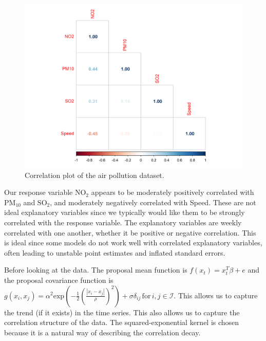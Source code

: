 \documentclass[a4paper, 10pt]{article}
\begin{document}
\begin{flushleft}
      \begin{figure}[H]
         \raggedright
         \includegraphics[width=0.48\linewidth]{../images/corrplot_2019.png}
         \caption{Correlation plot of the air pollution dataset.}
      \end{figure}

      Our response variable $\text{NO}_{2}$ appears to be moderately positively correlated with $\text{PM}_{10}$ and $\text{SO}_{2}$, and moderately negatively correlated with Speed. These are not ideal explanatory variables since we typically would like them to be strongly correlated with the response variable. The explanatory variables are weekly correlated with one another, whether it be positive or negative correlation. This is ideal since some models do not work well with correlated explanatory variables, often leading to unstable point estimates and inflated standard errors.

      \vspace{1em}

      Before looking at the data. The proposal mean function is $f(x_{t}) = x_{t}^{T} \beta + e$ and the proposal covariance function is $g(x_{i}, x_{j}) = \alpha^{2} \text{exp}(- \frac{1}{2} (\frac{|x_i - x_j|}{\rho})^2) + \sigma\delta_{ij} \, \text{for} \, i,j \in \mathcal{I}$. This allows us to capture the trend (if it exists) in the time series. This also allows us to capture the correlation structure of the data. The squared-exponential kernel is chosen because it is a natural way of describing the correlation decay.


\end{flushleft}
\end{document}
